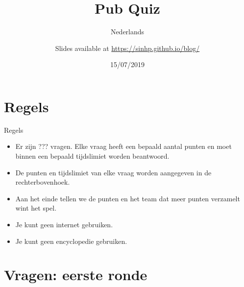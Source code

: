\documentclass[10pt]{beamer}
\title{Pub Quiz}
\subtitle{Nederlands}
\date{15/07/2019}
\date{}
\author{Slides available at \url{https://sinhp.github.io/blog/}}
\institute{Dizzy}
\begin{document}
\maketitle


\section{Regels}

\begin{frame}[fragile]{Regels}
    \begin{itemize}
        \item Er zijn ??? vragen. Elke vraag heeft een bepaald aantal punten en moet binnen een bepaald tijdslimiet worden beantwoord.
        \item De punten en tijdslimiet van elke vraag worden aangegeven in de rechterbovenhoek. 
        \item Aan het einde tellen we de punten en het team dat meer punten verzamelt wint het spel.
        \item Je kunt geen internet gebruiken.
        \item Je kunt geen encyclopedie gebruiken.
    \end{itemize}
\end{frame}


\section{Vragen: eerste ronde}


\begin{frame}[standout]
 \begin{center}
\end{center}
\end{frame}
\end{document}
